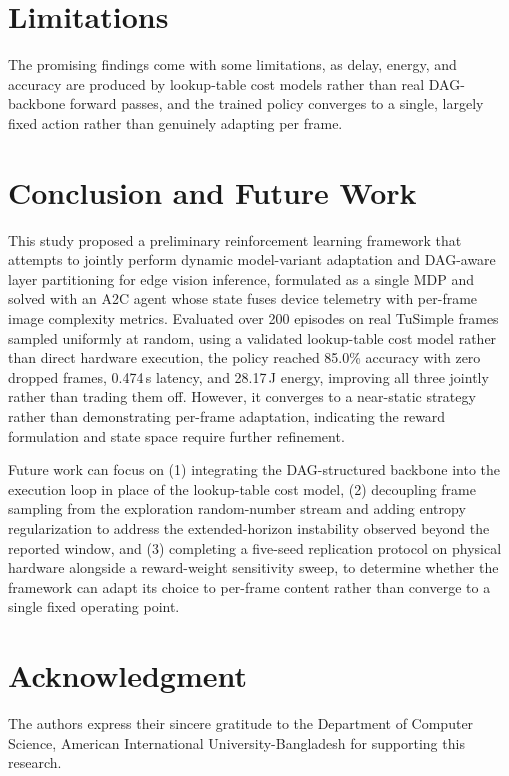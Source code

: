 \documentclass[conference]{IEEEtran}
\begin{document}

\section{Limitations} \label{sec:limF}
The promising findings come with some limitations, as delay, energy, and accuracy are produced by lookup-table cost models rather than real DAG-backbone forward passes, and the trained policy converges to a single, largely fixed action rather than genuinely adapting per frame.

\section{Conclusion and Future Work} \label{sec:con}
This study proposed a preliminary reinforcement learning framework that attempts to jointly perform dynamic model-variant adaptation and DAG-aware layer partitioning for edge vision inference, formulated as a single MDP and solved with an A2C agent whose state fuses device telemetry with per-frame image complexity metrics. Evaluated over 200 episodes on real TuSimple frames sampled uniformly at random, using a validated lookup-table cost model rather than direct hardware execution, the policy reached 85.0\% accuracy with zero dropped frames, 0.474\,s latency, and 28.17\,J energy, improving all three jointly rather than trading them off. However, it converges to a near-static strategy rather than demonstrating per-frame adaptation, indicating the reward formulation and state space require further refinement.

Future work can focus on (1) integrating the DAG-structured backbone into the execution loop in place of the lookup-table cost model, (2) decoupling frame sampling from the exploration random-number stream and adding entropy regularization to address the extended-horizon instability observed beyond the reported window, and (3) completing a five-seed replication protocol on physical hardware alongside a reward-weight sensitivity sweep, to determine whether the framework can adapt its choice to per-frame content rather than converge to a single fixed operating point.

\section*{Acknowledgment}
The authors express their sincere gratitude to the Department of Computer Science, American International University-Bangladesh for supporting this research.



\balance
\end{document}
